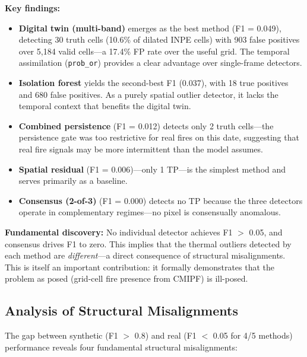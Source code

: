\documentclass[11pt,twocolumn,a4paper]{article}
\newcommand{\code}[1]{\texttt{#1}}
\newcommand{\abbrev}[1]{{\small\textsc{#1}}}
\begin{document}
\textbf{Key findings:}
\begin{itemize}
  \item \textbf{Digital twin (multi-band)} emerges as the best method (F1 = 0.049), detecting 30 truth cells (10.6\% of dilated \abbrev{INPE} cells) with 903 false positives over 5,184 valid cells---a 17.4\% \abbrev{FP} rate over the useful grid. The temporal assimilation (\code{prob\_or}) provides a clear advantage over single-frame detectors.
  \item \textbf{Isolation forest} yields the second-best F1 (0.037), with 18 true positives and 680 false positives. As a purely spatial outlier detector, it lacks the temporal context that benefits the digital twin.
  \item \textbf{Combined persistence} (F1 = 0.012) detects only 2 truth cells---the persistence gate was too restrictive for real fires on this date, suggesting that real fire signals may be more intermittent than the model assumes.
  \item \textbf{Spatial residual} (F1 = 0.006)---only 1 TP---is the simplest method and serves primarily as a baseline.
  \item \textbf{Consensus (2-of-3)} (F1 = 0.000) detects no TP because the three detectors operate in complementary regimes---no pixel is consensually anomalous.
\end{itemize}

\textbf{Fundamental discovery:} No individual detector achieves F1 $>$ 0.05, and consensus drives F1 to zero. This implies that the thermal outliers detected by each method are \emph{different}---a direct consequence of structural misalignments. This is itself an important contribution: it formally demonstrates that the problem as posed (grid-cell fire presence from \abbrev{CMIPF}) is ill-posed.

\subsection{Analysis of Structural Misalignments}

The gap between synthetic (F1 $>$ 0.8) and real (F1 $<$ 0.05 for 4/5 methods) performance reveals four fundamental structural misalignments:
\end{document}
